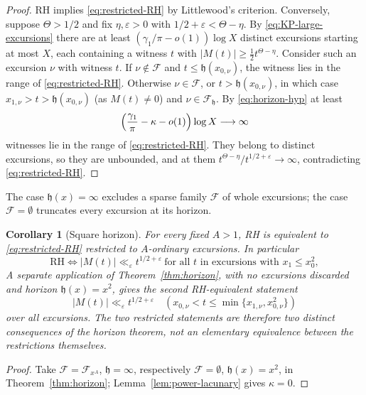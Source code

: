 \documentclass[11pt]{amsart}
\numberwithin{equation}{section}
\theoremstyle{plain}
\newtheorem{corollary}[theorem]{Corollary}
\theoremstyle{definition}
\theoremstyle{remark}
\newcommand{\eps}{\varepsilon}
\newcommand{\F}{\mathcal{F}}
\begin{document}
\begin{proof}
RH implies \eqref{eq:restricted-RH} by Littlewood's criterion. Conversely,
suppose $\Theta>1/2$ and fix $\eta,\eps>0$ with
$1/2+\eps<\Theta-\eta$. By \eqref{eq:KP-large-excursions} there are at least
$(\gamma_1/\pi-o(1))\log X$ distinct excursions starting at most $X$, each
containing a witness $t$ with $|M(t)|\ge\frac12t^{\Theta-\eta}$. Consider
such an excursion $\nu$ with witness $t$. If $\nu\notin\F$ and
$t\le \mathfrak h(x_{0,\nu})$, the witness lies in the range of
\eqref{eq:restricted-RH}. Otherwise $\nu\in\F$, or $t>\mathfrak h(x_{0,\nu})$, in
which case $x_{1,\nu}>t>\mathfrak h(x_{0,\nu})$ (as $M(t)\ne0$) and $\nu\in\F_{\mathfrak h}$. By
\eqref{eq:horizon-hyp} at least
\[
\Bigl(\frac{\gamma_1}{\pi}-\kappa-o(1)\Bigr)\log X\longrightarrow\infty
\]
witnesses lie in the range of \eqref{eq:restricted-RH}. They belong to
distinct excursions, so they are unbounded, and at them
$t^{\Theta-\eta}/t^{1/2+\eps}\to\infty$, contradicting
\eqref{eq:restricted-RH}.
\end{proof}

The case $\mathfrak h(x)=\infty$ excludes a sparse family $\F$ of whole excursions;
the case $\F=\emptyset$ truncates every excursion at its horizon.

\begin{corollary}[Square horizon]
\label{cor:power-ordinary-RH}
For every fixed $A>1$, RH is equivalent to \eqref{eq:restricted-RH}
restricted to $A$-ordinary excursions. In particular
\begin{equation}
\label{eq:square-horizon-RH}
\boxed{\ \mathrm{RH}\iff
|M(t)|\ll_\eps t^{1/2+\eps}
\ \text{for all $t$ in excursions with }x_1\le x_0^2,\ }
\end{equation}
A separate application of Theorem~\ref{thm:horizon}, with no excursions
discarded and horizon $\mathfrak h(x)=x^2$, gives the second RH-equivalent
statement
\[
 |M(t)|\ll_\eps t^{1/2+\eps}
 \quad(x_{0,\nu}<t\le\min\{x_{1,\nu},x_{0,\nu}^2\})
\]
over all excursions.  The two restricted statements are therefore two
distinct consequences of the horizon theorem, not an elementary equivalence
between the restrictions themselves.
\end{corollary}

\begin{proof}
Take $\F=\F_{x^A}$, $\mathfrak h=\infty$, respectively $\F=\emptyset$, $\mathfrak h(x)=x^2$, in
Theorem~\ref{thm:horizon}; Lemma~\ref{lem:power-lacunary} gives
$\kappa=0$.
\end{proof}
\end{document}
